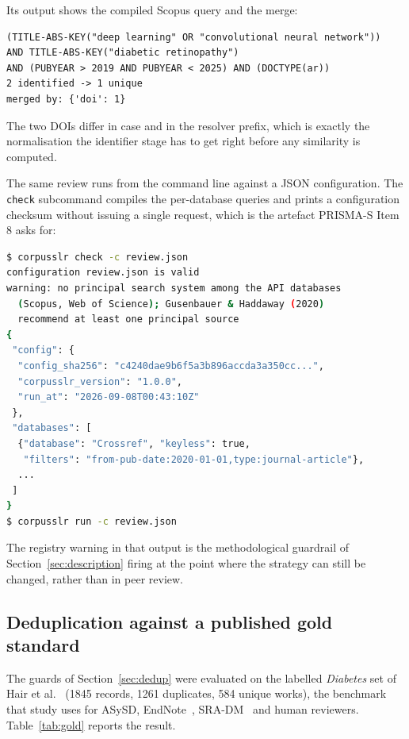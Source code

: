 \documentclass[final,5p,times,twocolumn]{elsarticle}
\begin{document}
Its output shows the compiled Scopus query and the merge:

\begin{lstlisting}[caption={Output of Listing~\ref{lst:api}, as
executed.},label={lst:out}]
(TITLE-ABS-KEY("deep learning" OR "convolutional neural network"))
AND TITLE-ABS-KEY("diabetic retinopathy")
AND (PUBYEAR > 2019 AND PUBYEAR < 2025) AND (DOCTYPE(ar))
2 identified -> 1 unique
merged by: {'doi': 1}
\end{lstlisting}

The two DOIs differ in case and in the resolver prefix, which is exactly the
normalisation the identifier stage has to get right before any similarity is
computed.

The same review runs from the command line against a JSON configuration.
The \texttt{check} subcommand compiles the per-database queries and prints a
configuration checksum without issuing a single request, which is the artefact
PRISMA-S Item 8 asks for:

\begin{lstlisting}[language=bash,caption={Dry-run plan from the command-line
interface.},label={lst:cli}]
$ corpusslr check -c review.json
configuration review.json is valid
warning: no principal search system among the API databases
  (Scopus, Web of Science); Gusenbauer & Haddaway (2020)
  recommend at least one principal source
{
 "config": {
  "config_sha256": "c4240dae9b6f5a3b896accda3a350cc...",
  "corpusslr_version": "1.0.0",
  "run_at": "2026-09-08T00:43:10Z"
 },
 "databases": [
  {"database": "Crossref", "keyless": true,
   "filters": "from-pub-date:2020-01-01,type:journal-article"},
  ...
 ]
}
$ corpusslr run -c review.json
\end{lstlisting}

The registry warning in that output is the methodological guardrail of
Section~\ref{sec:description} firing at the point where the strategy can still
be changed, rather than in peer review.

\subsection{Deduplication against a published gold standard}

The guards of Section~\ref{sec:dedup} were evaluated on the labelled
\emph{Diabetes} set of Hair et
al.~\cite{hair2023} (1845 records, 1261 duplicates, 584 unique works), the
benchmark that study uses for ASySD, EndNote~\cite{bramer2016},
SRA-DM~\cite{rathbone2015} and human reviewers.
Table~\ref{tab:gold} reports the result.
\end{document}
